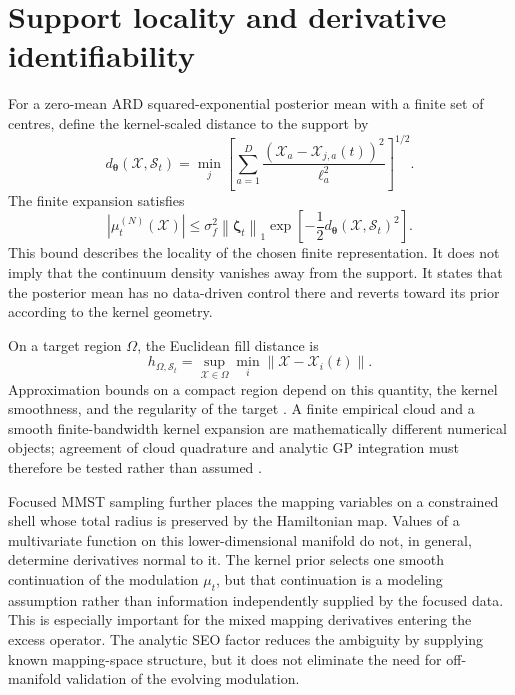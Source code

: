 \documentclass[
  11pt,
  letterpaper,
  onehalfspacing,
  normalmargins,
  equalmargins,
  oneside
]{ut-thesis}
\begin{document}
\section{Support locality and derivative identifiability}
\label{appsec:support-locality-identifiability}

For a zero-mean ARD squared-exponential posterior mean with a finite set of
centres, define the kernel-scaled distance to the support by
\begin{equation}
d_{\boldsymbol\theta}
\left(
\boldsymbol{\mathcal X},\mathcal S_t
\right)
=
\min_j
\left[
\sum_{a=1}^{D}
\frac{
\left(
\mathcal X_a-\mathcal X_{j,a}(t)
\right)^2
}{\ell_a^2}
\right]^{1/2}.
\label{appeq:scaled-support-distance}
\end{equation}
The finite expansion satisfies
\begin{equation}
\left|
\mu_t^{(N)}(\boldsymbol{\mathcal X})
\right|
\le
\sigma_f^2
\left\|\boldsymbol\zeta_t\right\|_1
\exp\left[
-\frac{1}{2}
d_{\boldsymbol\theta}
\left(
\boldsymbol{\mathcal X},\mathcal S_t
\right)^2
\right].
\label{appeq:gp-locality-bound}
\end{equation}
This bound describes the locality of the chosen finite representation. It does
not imply that the continuum density vanishes away from the support. It states
that the posterior mean has no data-driven control there and reverts toward
its prior according to the kernel geometry.

On a target region $\Omega$, the Euclidean fill distance is
\begin{equation}
h_{\Omega,\mathcal S_t}
=
\sup_{\boldsymbol{\mathcal X}\in\Omega}
\min_i
\left\|
\boldsymbol{\mathcal X}-\boldsymbol{\mathcal X}_i(t)
\right\|.
\label{appeq:fill-distance}
\end{equation}
Approximation bounds on a compact region depend on this quantity, the kernel
smoothness, and the regularity of the target
\cite{Wendland2005,SchabackWendland2006}. A finite empirical cloud and a
smooth finite-bandwidth kernel expansion are mathematically different
numerical objects; agreement of cloud quadrature and analytic GP integration
must therefore be tested rather than assumed
\cite{HosseiniNigamStockie2016}.

Focused MMST sampling further places the mapping variables on a constrained
shell whose total radius is preserved by the Hamiltonian map. Values of a
multivariate function on this lower-dimensional manifold do not, in general,
determine derivatives normal to it. The kernel prior selects one smooth
continuation of the modulation $\mu_t$, but that continuation is a modeling
assumption rather than information independently supplied by the focused data.
This is especially important for the mixed mapping derivatives entering the
excess operator. The analytic SEO factor reduces the ambiguity by supplying
known mapping-space structure, but it does not eliminate the need for
off-manifold validation of the evolving modulation.
\end{document}

